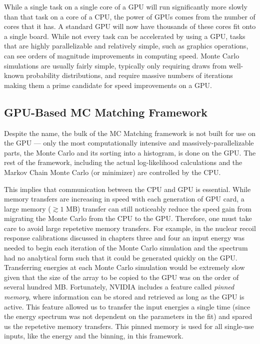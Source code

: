 While a single task on a single core of a GPU will run significantly more slowly than that task on a core of a CPU, the power of GPUs comes from the number of cores that it has.  A standard GPU will now have thousands of these cores fit onto a single board.  While not every task can be accelerated by using a GPU, tasks that are highly parallelizable and relatively simple, such as graphics operations, can see orders of magnitude improvements in computing speed.  Monte Carlo simulations are usually fairly simple, typically only requiring draws from well-known probability distributions, and require massive numbers of iterations making them a prime candidate for speed improvements on a GPU.



\subsection{GPU-Based MC Matching Framework}


Despite the name, the bulk of the MC Matching framework is not built for use on the GPU --- only the most computationally intensive and massively-parallelizable parts, the Monte Carlo and its sorting into a histogram, is done on the GPU.  The rest of the framework, including the actual log-likelihood calculations and the Markov Chain Monte Carlo (or minimizer) are controlled by the CPU.  

This implies that communication between the CPU and GPU is essential.  While memory transfers are increasing in speed with each generation of GPU card, a large memory ($\gtrsim 1$ MB) transfer can still noticeably reduce the speed gain from migrating the Monte Carlo from the CPU to the GPU.  Therefore, one must take care to avoid large repetetive memory transfers.  For example, in the nuclear recoil response calibrations discussed in chapters three and four an input energy was needed to begin each iteration of the Monte Carlo simulation and the spectrum had no analytical form such that it could be generated quickly on the GPU.  Transferring energies at each Monte Carlo simulation would be extremely slow given that the size of the array to be copied to the GPU was on the order of several hundred MB.  Fortunately, NVIDIA includes a feature called \textit{pinned memory}, where information can be stored and retrieved as long as the GPU is active.  This feature allowed us to transfer the input energies a single time (since the energy spectrum was not dependent on the parameters in the fit) and spared us the repetetive memory transfers.  This pinned memory is used for all single-use inputs, like the energy and the binning, in this framework.

